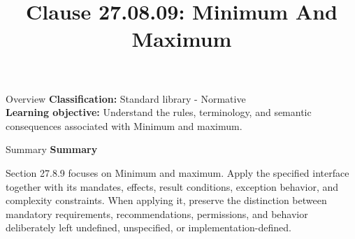 \documentclass[10pt,letterpaper]{article}
\title{Clause 27.08.09: Minimum And Maximum}
\author{}
\date{}
\begin{document}
\maketitle
\begin{CornellOverviewBox}{Overview}
\textbf{Classification:} Standard library - Normative\\[2pt]
\textbf{Learning objective:} Understand the rules, terminology, and semantic consequences associated with Minimum and maximum.
\end{CornellOverviewBox}\begin{CornellSummaryBox}{Summary}
{\sffamily\bfseries\color{Accent} Summary}\par\vspace{3pt}Section 27.8.9 focuses on Minimum and maximum. Apply the specified interface together with its mandates, effects, result conditions, exception behavior, and complexity constraints. When applying it, preserve the distinction between mandatory requirements, recommendations, permissions, and behavior deliberately left undefined, unspecified, or implementation-defined.
\end{CornellSummaryBox}
\end{document}
